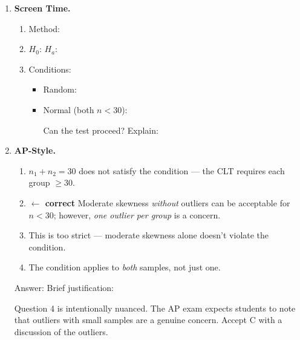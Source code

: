 \documentclass[10pt]{article}
\begin{document}
\begin{enumerate}
\item \textbf{Screen Time.}

\begin{enumerate}[label=\alph*.]
  \item Method: 
  \item $H_0$:  \quad $H_a$: 
  \item Conditions:
        \begin{itemize}
          \item Random: 
          \item Normal (both $n < 30$): 

                Can the test proceed?  \quad Explain: 
        \end{itemize}
\end{enumerate}
\vspace{0.06in}

\item \textbf{AP-Style.}

\begin{enumerate}[label=(\Alph*)]
  \item $n_1 + n_2 = 30$ does not satisfy the condition --- the CLT requires each group $\ge 30$.
  \item \textcolor{keyred}{\textbf{$\leftarrow$ correct}} Moderate skewness \emph{without} outliers can be acceptable for $n < 30$; however, \emph{one outlier per group} is a concern.
  \item This is too strict --- moderate skewness alone doesn't violate the condition.
  \item The condition applies to \emph{both} samples, not just one.
\end{enumerate}
\vspace{0.04in}
Answer:  \quad Brief justification: 

\begin{teachernote}
Question 4 is intentionally nuanced. The AP exam expects students to note that outliers
with small samples are a genuine concern. Accept C with a discussion of the outliers.
\end{teachernote}

\end{enumerate}
\end{document}
